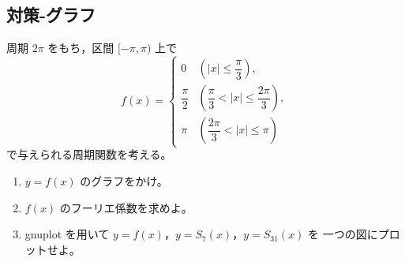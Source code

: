 \subsection{対策-グラフ}
\begin{exercise}[段階関数のフーリエ係数とグラフ]
	周期 \(2\pi\) をもち，区間 \([-\pi,\pi)\) 上で
	\[
	f(x)=
	\begin{cases}
		0
		& \left(|x|\leq \dfrac{\pi}{3}\right),\\[6pt]
		\dfrac{\pi}{2}
		& \left(\dfrac{\pi}{3}<|x|\leq \dfrac{2\pi}{3}\right),\\[6pt]
		\pi
		& \left(\dfrac{2\pi}{3}<|x|\leq \pi\right)
	\end{cases}
	\]
	で与えられる周期関数を考える。
	
	\begin{enumerate}
		\item \(y=f(x)\) のグラフをかけ。
		\item \(f(x)\) のフーリエ係数を求めよ。
		\item gnuplot を用いて \(y=f(x)\)，\(y=S_7(x)\)，\(y=S_{31}(x)\) を
		一つの図にプロットせよ。
	\end{enumerate}
\end{exercise}

